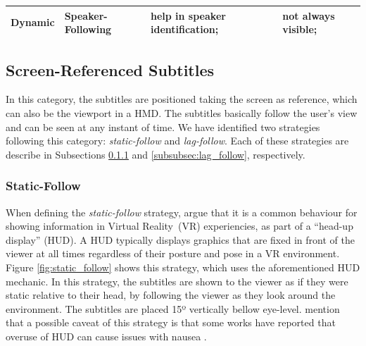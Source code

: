 \begin{table}[!ht]
\begin{tabular}{@{}llll@{}}
\textbf{Dynamic}                                                & Speaker-Following  & help in speaker identification;                                                                        & not always visible;                                                                                            \\ \bottomrule
\end{tabular}
\end{table}
\endgroup

\subsection{Screen-Referenced Subtitles}
\label{subsec:screen_referenced}
In this category, the subtitles are positioned taking the screen as reference, which can also be the viewport in a HMD. The subtitles basically follow the user's view and can be seen at any instant of time. We have identified two strategies following this category: \emph{static-follow} and \emph{lag-follow}. Each of these strategies are describe in Subsections \ref{subsubsec:static_follow} and \ref{subsubsec:lag_follow}, respectively.

\subsubsection{Static-Follow}
\label{subsubsec:static_follow}

When defining the \emph{static-follow} strategy,  argue that it is a common behaviour for showing information in Virtual Reality~(VR) experiencies, as part of a ``head-up display'' (HUD). A HUD typically displays graphics that are fixed in front of the viewer at all times regardless of their posture and pose in a VR environment. Figure \ref{fig:static_follow} shows this strategy, which uses the aforementioned HUD mechanic. In this strategy, the subtitles are shown to the viewer as if they were static relative to their head, by following the viewer as they look around the environment. The subtitles are placed 15º vertically bellow eye-level.  mention that a possible caveat of this strategy is that some works have reported that overuse of HUD can cause issues with nausea \cite{laviola2000discussion, sharples2008virtual}.

